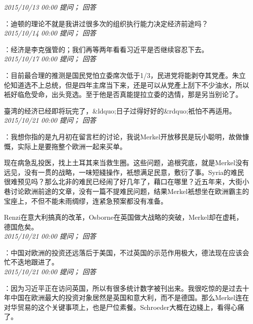 \documentclass[twocolumn]{ctexart}
\begin{document}
\textit{\hfill\noindent\small 2015/10/13 00:00 提问； 回答}

：迪顿的理论不就是我讲过很多次的组织执行能力决定经济前途吗？\\

\textit{\hfill\noindent\small 2015/10/14 00:00 提问； 回答}

：经济是李克强管的；我们再等两年看看习近平是否继续容忍下去。\\

\textit{\hfill\noindent\small 2015/10/17 00:00 提问； 回答}

：目前最合理的推测是国民党怕立委席次低于1/3，民进党将能剥夺其党產。朱立伦知道选不上总统，但是四年主席当下来，还是可以从党產上刮下不少油水，所以衹好临危受命，出头竞选。至于他是否真能提拉立委的选情，那是另当别论了。

臺湾的经济已经即将玩完了，\&ldquo;日子过得好好的\&rdquo;衹怕不再适用。\\

\textit{\hfill\noindent\small 2015/10/21 00:00 提问； 回答}

：我想你指的是九月初在留言栏的讨论，我说Merkel开放移民是玩小聪明，故做慷慨，实际上是要拖整个欧洲一起来买单。

现在病急乱投医，找上土耳其来当救生圈。这些问题，追根究底，就是Merkel没有远见，没有一贯的战略，一味短綫操作，衹想满足民意，敷衍了事。Syria的难民很难预见吗？那么北非的难民已经闹了好几年了，藉口在哪里？近五年来，大街小巷讨论欧洲前途的文章，没有一篇不提难民问题，结果Merkel衹想坐在欧洲霸主的宝座上，不但不能未雨绸缪，连紧急预案都没有准备。

Renzi在意大利搞真的改革，Osborne在英国做大战略的突破，Merkel却在虚耗，德国危矣。\\

\textit{\hfill\noindent\small 2015/10/21 00:00 提问； 回答}

：中国对欧洲的投资还远落后于美国，不过英国的示范作用极大，德法现在应该会忙不迭地跟进了。\\

\textit{\hfill\noindent\small 2015/10/21 00:00 提问； 回答}

：因为习近平正在访问英国，所以有很多统计数字被刊出来。我很吃惊的是过去十年中国在欧洲最大的投资对象居然是英国和意大利，而不是德国。那么Merkel连在对华贸易的这个关键事项上，也是尸位素餐。Schroeder大概在边綫上，看得心痛了。\\
\end{document}

